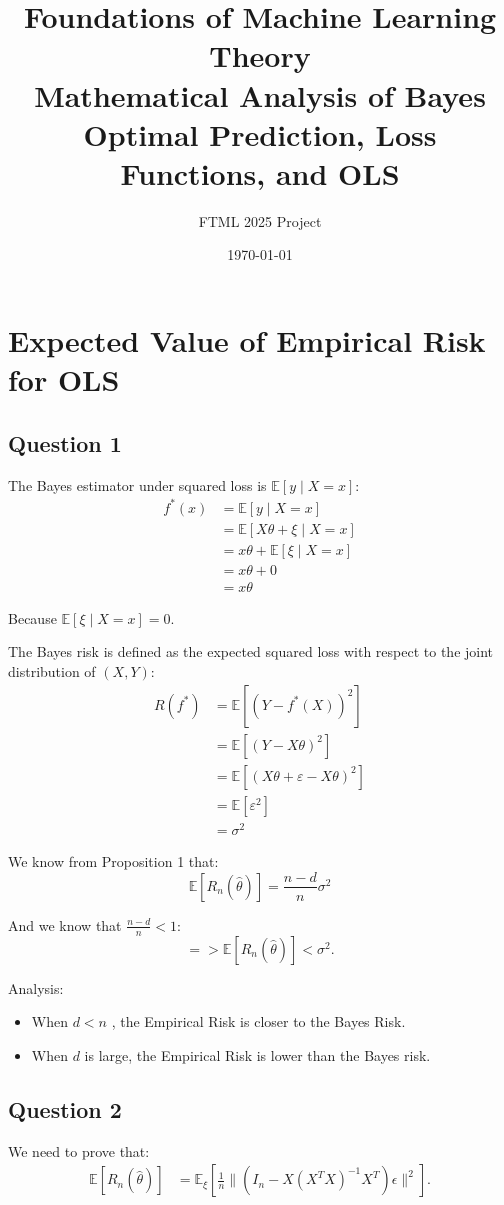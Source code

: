 \documentclass[11pt,a4paper]{article}
\title{\textbf{Foundations of Machine Learning Theory}\\
\large Mathematical Analysis of Bayes Optimal Prediction, Loss Functions, and OLS}
\author{FTML 2025 Project}
\date{\today}
\theoremstyle{definition}
\theoremstyle{remark}
\begin{document}
\setcounter{section}{2}
\section{Expected Value of Empirical Risk for OLS}
\setcounter{subsection}{3}
\subsection{Question 1}
The Bayes estimator under squared loss is $\mathbb{E}[y \mid X = x]$:
\begin{align}
f^*(x) &= \mathbb{E}[y \mid X = x] \\
&= \mathbb{E}[X\theta + \xi \mid X = x] \\
&= x\theta + \mathbb{E}[\xi \mid X = x] \\
&= x\theta + 0 \\
&= x\theta
\end{align}

Because $\mathbb{E}[\xi \mid X = x] = 0$.

The Bayes risk is defined as the expected squared loss with respect to the joint distribution of $(X, Y)$:
\begin{align}
R(f^*) &= \mathbb{E}[(Y - f^*(X))^2] \\
&= \mathbb{E}[(Y - X\theta)^2] \\
&= \mathbb{E}[(X\theta + \varepsilon - X\theta)^2] \\
&= \mathbb{E}[\varepsilon^2] \\
&= \sigma^2 
\end{align}

We know from Proposition 1 that:
\begin{equation}
\mathbb{E}[R_n(\hat{\theta})] = \frac{n - d}{n} \sigma^2 \label{eq:12}
\end{equation}

And we know that $\frac{n - d}{n} < 1$:
\[
=> \mathbb{E}[R_n(\hat{\theta})] < \sigma^2.
\]

Analysis:
\begin{itemize}
    \item When $d < n$ , the Empirical Risk is closer to the Bayes Risk.
    \item When $d$ is large, the Empirical Risk is lower than the Bayes risk.
\end{itemize}

\setcounter{subsection}{3}
\subsection{Question 2}
We need to prove that:
\begin{align}
\mathbb{E} [R_n(\hat{\theta})] &= \mathbb{E}_\xi \left[ \frac{1}{n} \|(I_n - X(X^T X)^{-1} X^T) \epsilon \|^2 \right].
\end{align}
\end{document}
